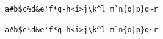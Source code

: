 \documentclass{article}
\begin{document}
\begin{lstlisting}
a#b$c%d&e'f*g-h<i>j\k^l_m`n{o|p}q~r
\end{lstlisting}
\begin{lstlisting}[basicstyle=\ttfamily]
a#b$c%d&e'f*g-h<i>j\k^l_m`n{o|p}q~r
\end{lstlisting}
\end{document}
